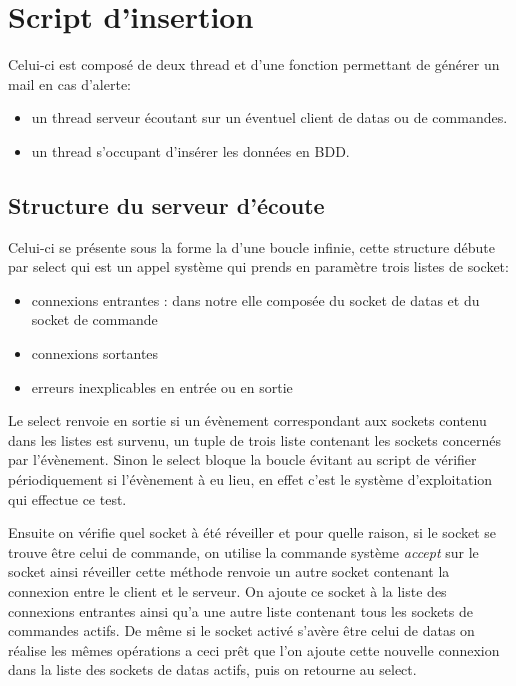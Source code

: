 \newpage

\section*{Script d'insertion}

Celui-ci est composé de deux thread et d'une fonction permettant de générer un mail en cas d'alerte:

\begin{itemize}
\item un thread serveur écoutant sur un éventuel client de datas ou de commandes.
\item un thread s'occupant d'insérer les données en BDD.
\end{itemize}

\subsection*{Structure du serveur d'écoute}
Celui-ci se présente sous la forme la d'une boucle infinie, cette structure débute par select qui est un appel système qui prends en paramètre trois listes de socket:

\begin{itemize}
\item connexions entrantes : dans notre elle composée du socket de datas et du socket de commande
\item connexions sortantes
\item erreurs inexplicables en entrée ou en sortie
\end{itemize}

Le select renvoie en sortie si un évènement correspondant aux sockets contenu dans les listes est survenu, un tuple de trois liste contenant les sockets concernés par l'évènement. Sinon le select bloque la boucle évitant au script de vérifier périodiquement si l'évènement à eu lieu, en effet c'est le système d'exploitation qui effectue ce test.

Ensuite on vérifie quel socket à été réveiller et pour quelle raison, si le socket se trouve être celui de commande, on utilise la commande système \textit{accept} sur le socket ainsi réveiller cette méthode renvoie un autre socket contenant la connexion entre le client et le serveur. On ajoute ce socket à la liste des connexions entrantes ainsi qu'a une autre liste contenant tous les sockets de commandes actifs. De même si le socket activé s'avère être celui de datas on réalise les mêmes opérations a ceci prêt que l'on ajoute cette nouvelle connexion dans la liste des sockets de datas actifs, puis on retourne au select.

